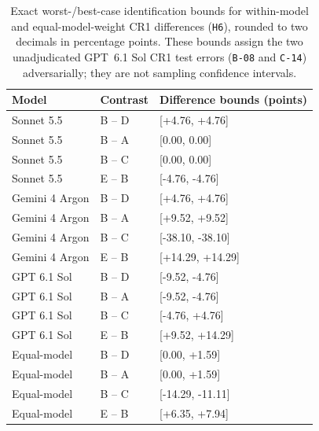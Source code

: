 \begin{table}[!htbp]
\centering\small
\caption{Exact worst-/best-case identification bounds for within-model
and equal-model-weight CR1 differences (\texttt{H6}), rounded to two
decimals in percentage points. These bounds assign the two unadjudicated
GPT~6.1 Sol CR1 test errors (\texttt{B-08} and \texttt{C-14}) adversarially;
they are not sampling confidence intervals.}\label{tab:resultscrbounds}
\begin{tabular*}{\textwidth}{@{\extracolsep{\fill}}lll@{}}
\toprule
Model & Contrast & Difference bounds (points) \\
\midrule
Sonnet 5.5 & B -- D & [+4.76, +4.76] \\
Sonnet 5.5 & B -- A & [0.00, 0.00] \\
Sonnet 5.5 & B -- C & [0.00, 0.00] \\
Sonnet 5.5 & E -- B & [-4.76, -4.76] \\
\midrule
Gemini 4 Argon & B -- D & [+4.76, +4.76] \\
Gemini 4 Argon & B -- A & [+9.52, +9.52] \\
Gemini 4 Argon & B -- C & [-38.10, -38.10] \\
Gemini 4 Argon & E -- B & [+14.29, +14.29] \\
\midrule
GPT 6.1 Sol & B -- D & [-9.52, -4.76] \\
GPT 6.1 Sol & B -- A & [-9.52, -4.76] \\
GPT 6.1 Sol & B -- C & [-4.76, +4.76] \\
GPT 6.1 Sol & E -- B & [+9.52, +14.29] \\
\midrule
Equal-model & B -- D & [0.00, +1.59] \\
Equal-model & B -- A & [0.00, +1.59] \\
Equal-model & B -- C & [-14.29, -11.11] \\
Equal-model & E -- B & [+6.35, +7.94] \\
\bottomrule
\end{tabular*}
\end{table}

